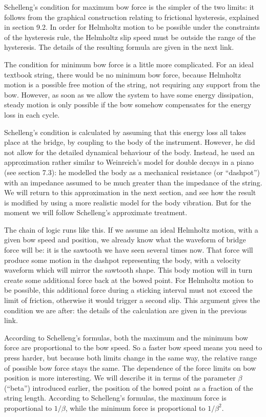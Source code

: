   Schelleng’s condition for maximum bow force is the simpler of the two limits: 
  it follows from the graphical construction relating to frictional hysteresis, 
  explained in section 9.2. In order for Helmholtz motion to be possible under 
  the constraints of the hysteresis rule, the Helmholtz slip speed must be 
  outside the range of the hysteresis. The details of the resulting formula are 
  given in the next link. 

  The condition for minimum bow force is a little more complicated. For an 
  ideal textbook string, there would be no minimum bow force, because Helmholtz 
  motion is a possible free motion of the string, not requiring any support 
  from the bow. However, as soon as we allow the system to have some energy 
  dissipation, steady motion is only possible if the bow somehow compensates 
  for the energy loss in each cycle. 

  Schelleng's condition is calculated by assuming that this energy loss all 
  takes place at the bridge, by coupling to the body of the instrument. 
  However, he did not allow for the detailed dynamical behaviour of the body. 
  Instead, he used an approximation rather similar to Weinreich's model for 
  double decays in a piano (see section 7.3): he modelled the body as a 
  mechanical resistance (or ``dashpot'') with an impedance assumed to be much 
  greater than the impedance of the string. We will return to this 
  approximation in the next section, and see how the result is modified by 
  using a more realistic model for the body vibration. But for the moment we 
  will follow Schelleng's approximate treatment. 

  The chain of logic runs like this. If we assume an ideal Helmholtz motion, 
  with a given bow speed and position, we already know what the waveform of 
  bridge force will be: it is the sawtooth we have seen several times now. That 
  force will produce some motion in the dashpot representing the body, with a 
  velocity waveform which will mirror the sawtooth shape. This body motion will 
  in turn create some additional force back at the bowed point. For Helmholtz 
  motion to be possible, this additional force during a sticking interval must 
  not exceed the limit of friction, otherwise it would trigger a second slip. 
  This argument gives the condition we are after: the details of the 
  calculation are given in the previous link. 

  According to Schelleng’s formulas, both the maximum and the minimum bow force 
  are proportional to the bow speed. So a faster bow speed means you need to 
  press harder, but because both limits change in the same way, the relative 
  range of possible bow force stays the same. The dependence of the force 
  limits on bow position is more interesting. We will describe it in terms of 
  the parameter $\beta$ (``beta'') introduced earlier, the position of the 
  bowed point as a fraction of the string length. According to Schelleng's 
  formulas, the maximum force is proportional to $1/\beta$, while the minimum 
  force is proportional to $1/\beta^2$. 

